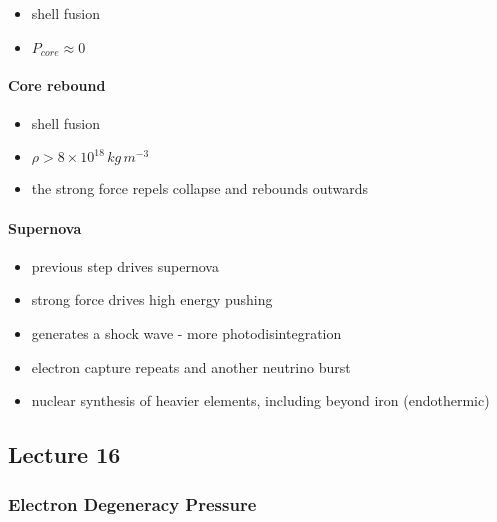 \documentclass[a4paper,11pt,normalem]{article}
\begin{document}
\begin{itemize}
\item
  shell fusion
\item
  \(P_{core} \approx 0\)
\end{itemize}

\paragraph{Core rebound}\label{core-rebound}

\begin{itemize}
\item
  shell fusion
\item
  \(\rho > 8\times10^{18}\,kg\,m^{-3}\)
\item
  the strong force repels collapse and rebounds outwards
\end{itemize}

\paragraph{Supernova}\label{supernova}

\begin{itemize}
\item
  previous step drives supernova
\item
  strong force drives high energy pushing
\item
  generates a shock wave - more photodisintegration
\item
  electron capture repeats and another neutrino burst
\item
  nuclear synthesis of heavier elements, including beyond iron
  (endothermic)
\end{itemize}

\subsection{Lecture 16}\label{lecture-16}

\subsubsection{Electron Degeneracy
Pressure}\label{electron-degeneracy-pressure}
\end{document}
